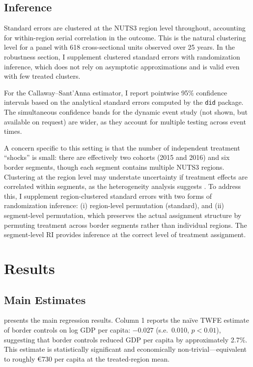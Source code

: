 \documentclass[12pt]{article}
\begin{document}
\subsection{Inference}

Standard errors are clustered at the NUTS3 region level throughout, accounting for within-region serial correlation in the outcome. This is the natural clustering level for a panel with 618 cross-sectional units observed over 25 years. In the robustness section, I supplement clustered standard errors with randomization inference, which does not rely on asymptotic approximations and is valid even with few treated clusters.

For the Callaway--Sant'Anna estimator, I report pointwise 95\% confidence intervals based on the analytical standard errors computed by the \texttt{did} package. The simultaneous confidence bands for the dynamic event study (not shown, but available on request) are wider, as they account for multiple testing across event times.

A concern specific to this setting is that the number of independent treatment ``shocks'' is small: there are effectively two cohorts (2015 and 2016) and six border segments, though each segment contains multiple NUTS3 regions. Clustering at the region level may understate uncertainty if treatment effects are correlated within segments, as the heterogeneity analysis suggests \citep{ConleyT2011, FermanP2019, MacKinnonW2018}. To address this, I supplement region-clustered standard errors with two forms of randomization inference: (i) region-level permutation (standard), and (ii) segment-level permutation, which preserves the actual assignment structure by permuting treatment across border segments rather than individual regions. The segment-level RI provides inference at the correct level of treatment assignment.


\section{Results}

\subsection{Main Estimates}

 presents the main regression results. Column 1 reports the na\"ive TWFE estimate of border controls on log GDP per capita: $-0.027$ (s.e.\ 0.010, $p < 0.01$), suggesting that border controls reduced GDP per capita by approximately 2.7\%. This estimate is statistically significant and economically non-trivial---equivalent to roughly \euro{}730 per capita at the treated-region mean.
\end{document}
